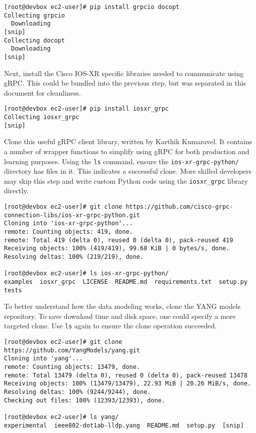 \begin{verbatim}
[root@devbox ec2-user]# pip install grpcio docopt
Collecting grpcio
  Downloading
[snip]
Collecting docopt
  Downloading
[snip]
\end{verbatim}

Next, install the Cisco IOS-XR specific libraries needed to communicate using
gRPC. This could be bundled into the previous step, but was separated in this
document for cleanliness.

\begin{verbatim}
[root@devbox ec2-user]# pip install iosxr_grpc
Collecting iosxr_grpc
[snip]
\end{verbatim}

Clone this useful gRPC client library, written by Karthik Kumaravel. It
contains a number of wrapper functions to simplify using gRPC for both
production and learning purposes. Using the \verb|ls| command, ensure the
\verb|ios-xr-grpc-python/| directory has files in it. This indicates a successful
clone. More skilled developers may skip this step and write custom Python code
using the \verb|iosxr_grpc| library directly.

\begin{verbatim}
[root@devbox ec2-user]# git clone https://github.com/cisco-grpc-connection-libs/ios-xr-grpc-python.git
Cloning into 'ios-xr-grpc-python'...
remote: Counting objects: 419, done.
remote: Total 419 (delta 0), reused 0 (delta 0), pack-reused 419
Receiving objects: 100% (419/419), 99.68 KiB | 0 bytes/s, done.
Resolving deltas: 100% (219/219), done.

[root@devbox ec2-user]# ls ios-xr-grpc-python/
examples  iosxr_grpc  LICENSE  README.md  requirements.txt  setup.py  tests
\end{verbatim}

To better understand how the data modeling works, clone the YANG models
repository. To save download time and disk space, one could specify a more
targeted clone. Use \verb|ls| again to ensure the clone operation succeeded.

\begin{verbatim}
[root@devbox ec2-user]# git clone https://github.com/YangModels/yang.git
Cloning into 'yang'...
remote: Counting objects: 13479, done.
remote: Total 13479 (delta 0), reused 0 (delta 0), pack-reused 13478
Receiving objects: 100% (13479/13479), 22.93 MiB | 20.26 MiB/s, done.
Resolving deltas: 100% (9244/9244), done.
Checking out files: 100% (12393/12393), done.

[root@devbox ec2-user]# ls yang/
experimental  ieee802-dot1ab-lldp.yang  README.md  setup.py  [snip]
\end{verbatim}

